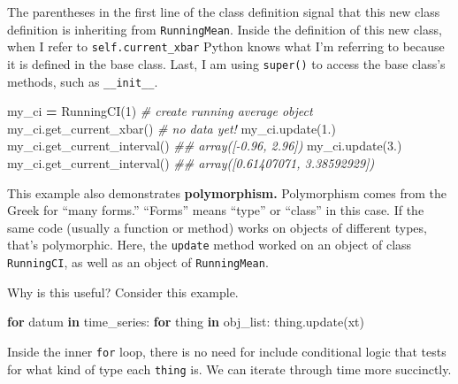 \documentclass[
  12pt,
  krantz2]{krantz}
\makeatletter
\newenvironment{Shaded}{\begin{snugshade}}{\end{snugshade}}
\newcommand{\CommentTok}[1]{\textcolor[rgb]{0.37,0.37,0.37}{\textit{#1}}}
\newcommand{\ControlFlowTok}[1]{\textcolor[rgb]{0.27,0.27,0.27}{\textbf{#1}}}
\newcommand{\DecValTok}[1]{\textcolor[rgb]{0.06,0.06,0.06}{#1}}
\newcommand{\FloatTok}[1]{\textcolor[rgb]{0.06,0.06,0.06}{#1}}
\newcommand{\KeywordTok}[1]{\textcolor[rgb]{0.27,0.27,0.27}{\textbf{#1}}}
\newcommand{\NormalTok}[1]{#1}
\newcommand{\OperatorTok}[1]{\textcolor[rgb]{0.43,0.43,0.43}{\textbf{#1}}}
\newenvironment{kframe}{%
\medskip{}
\setlength{\fboxsep}{.8em}
 \def\at@end@of@kframe{}%
 \ifinner\ifhmode%
  \def\at@end@of@kframe{\end{minipage}}%
  \begin{minipage}{\columnwidth}%
 \fi\fi%
 \def\FrameCommand##1{\hskip\@totalleftmargin \hskip-\fboxsep
 \colorbox{shadecolor}{##1}\hskip-\fboxsep
     \hskip-\linewidth \hskip-\@totalleftmargin \hskip\columnwidth}%
 \MakeFramed {\advance\hsize-\width
   \@totalleftmargin\z@ \linewidth\hsize
   \@setminipage}}%
 {\par\unskip\endMakeFramed%
 \at@end@of@kframe}
\renewenvironment{Shaded}{\begin{kframe}}{\end{kframe}}
\makeatother
\begin{document}
The parentheses in the first line of the class definition signal that this new class definition is inheriting from \texttt{RunningMean}. Inside the definition of this new class, when I refer to \texttt{self.current\_xbar} Python knows what I'm referring to because it is defined in the base class. Last, I am using \texttt{super()} to access the base class's methods, such as \texttt{\_\_init\_\_}.

\begin{Shaded}
\begin{Highlighting}[]
\NormalTok{my\_ci }\OperatorTok{=}\NormalTok{ RunningCI(}\DecValTok{1}\NormalTok{) }\CommentTok{\# create running average object}
\NormalTok{my\_ci.get\_current\_xbar() }\CommentTok{\# no data yet!}
\NormalTok{my\_ci.update(}\FloatTok{1.}\NormalTok{) }
\NormalTok{my\_ci.get\_current\_interval() }
\CommentTok{\#\# array([{-}0.96,  2.96])}
\NormalTok{my\_ci.update(}\FloatTok{3.}\NormalTok{)  }
\NormalTok{my\_ci.get\_current\_interval()  }
\CommentTok{\#\# array([0.61407071, 3.38592929])}
\end{Highlighting}
\end{Shaded}

This example also demonstrates \textbf{polymorphism.} Polymorphism comes from the Greek for ``many forms.'' ``Forms'' means ``type'' or ``class'' in this case. If the same code (usually a function or method) works on objects of different types, that's polymorphic. Here, the \texttt{update} method worked on an object of class \texttt{RunningCI}, as well as an object of \texttt{RunningMean}.

Why is this useful? Consider this example.

\begin{Shaded}
\begin{Highlighting}[]
\ControlFlowTok{for}\NormalTok{ datum }\KeywordTok{in}\NormalTok{ time\_series:}
  \ControlFlowTok{for}\NormalTok{ thing }\KeywordTok{in}\NormalTok{ obj\_list:}
\NormalTok{    thing.update(xt)}
\end{Highlighting}
\end{Shaded}

Inside the inner \texttt{for} loop, there is no need for include conditional logic that tests for what kind of type each \texttt{thing} is. We can iterate through time more succinctly.
\end{document}
